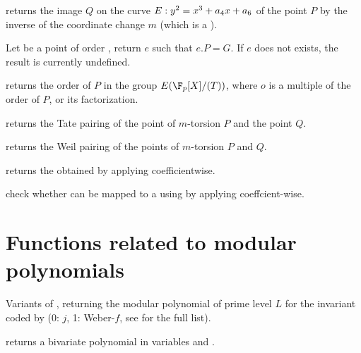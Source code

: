  returns
the image $Q$ on the curve $E:y^2=x^3+a_4\*x+a_6$ of the point $P$ by the
inverse of the coordinate change $m$ (which is a ).







 Let  be a
point of order , return $e$ such that $e.P=G$. If $e$ does not exists,
the result is currently undefined.

 returns the order
of $P$ in the group $E(\F_p[X]/(T))$, where $o$ is a multiple of the order of
$P$, or its factorization.

returns the Tate pairing of the point of $m$-torsion $P$ and the point $Q$.

returns the Weil pairing of the points of $m$-torsion $P$ and $Q$.

 returns the  obtained
by applying  coefficientwise.

 check whether  can
be mapped to a  using  by applying 
coeffcient-wise.

\section{Functions related to modular polynomials}

Variants of , returning the modular polynomial of prime
level $L$ for the invariant coded by  (0: $j$, 1: Weber-$f$, see
 for the full list).

returns a bivariate polynomial in variables  and .

